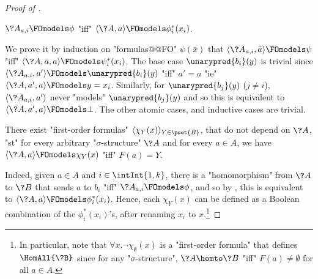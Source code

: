 \begin{proof}[Proof of ]
	\begin{claim}
		\AP\label{claim:finite-duality-uniformly-definable-homomorphisms-new-formulas}
		$\?A_{a,i} \FOmodels \phi$
		"iff" $\langle \?A, a \rangle \FOmodels \phi^*_i(x_i)$.
	\end{claim}
	We prove it by induction on "formulas@@FO" $\psi(\bar x)$
	that $\langle\?A_{a,i}, \bar a \rangle \FOmodels \psi$
		"iff" $\langle \?A, \bar a, a \rangle \FOmodels \psi^*_i(x_i)$.
	The base case $\unarypred{b_i}(y)$ is trivial since
	$\langle \?A_{a,i}, a' \rangle \FOmodels \unarypred{b_i}(y)$ "iff"
	$a' = a$ "ie" $\langle \?A, a', a \rangle \FOmodels y = x_i$.
	Similarly, for  $\unarypred{b_j}(y)$ ($j \neq i$),
	$\langle \?A_{a,i}, a' \rangle$ never "models" $\unarypred{b_j}(y)$
	and so this is equivalent to $\langle \?A, a', a \rangle \FOmodels \bot$.
	The other atomic cases, and inductive cases are trivial.

	\begin{claim}
		\AP\label{claim:finite-duality-uniformly-definable-homomorphisms-formulas}
		There exist "first-order formulas" $\langle \chi_Y(x)\rangle_{Y\in \pset{B}}$,
		that do not depend on $\?A$, "st" for every arbitrary "$\sigma$-structure" $\?A$
		and for every $a\in A$, we have $\langle \?A,a \rangle \FOmodels \chi_Y(x)$ "iff"
		$F(a) = Y$.
	\end{claim}
	Indeed, given $a\in A$ and $i \in \intInt{1,k}$, there is a "homomorphism" from $\?A$
	to $\?B$ that sends $a$ to $b_i$ "iff" $\?A_{a,i} \FOmodels \phi$, and so by , this is equivalent to
	$\langle \?A,a\rangle \FOmodels \phi^*_i(x_i)$. Hence, each $\chi_Y(x)$ can be defined as
	a Boolean combination of the $\phi^*_i(x_i)$'s, after renaming $x_i$ to $x$.\footnote{In 
	particular, note that $\forall x. \neg \chi_\emptyset(x)$ is a "first-order formula"
	that defines $\HomAll{\?B}$ since for any "$\sigma$-structure", $\?A \homto \?B$
	"iff" $F(a) \neq \emptyset$ for all $a \in A$.}


\end{proof}
